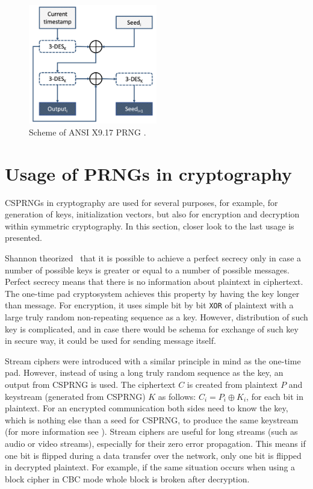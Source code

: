 \documentclass[
    digital,    %
    oneside,    %
    color,
    11pt,
    nocover,
    notable,
    nolof,
    nolot,
    final
]{fithesis3}
\renewcommand\_{\textunderscore\allowbreak}
\begin{document}
\begin{figure}[h]
	\centering
	\includegraphics[width=0.5\textwidth]{./images/pictures/x9-17-prng.png}
	\caption{Scheme of ANSI X9.17 PRNG \cite{ansi1985american,kelsey1998cryptanalytic}.}
	\label{fig:x9-17}
\end{figure}

\section{Usage of PRNGs in cryptography}

CSPRNGs in cryptography are used for several purposes, for example, for generation of keys, initialization vectors, but also for encryption and decryption within symmetric cryptography. In this section, closer look to the last usage is presented.

Shannon theorized~\cite{perfect-secrecy} that it is possible to achieve a perfect secrecy only in case a number of possible keys is greater or equal to a number of possible messages. Perfect secrecy means that there is no information about plaintext in ciphertext. The one-time pad cryptosystem achieves this property by having the key longer than message. For encryption, it uses simple bit by bit \texttt{XOR} of plaintext with a large truly random non-repeating sequence as a key. However, distribution of such key is complicated, and in case there would be schema for exchange of such key in secure way, it could be used for sending message itself. \cite{schneier1996applied}

Stream ciphers were introduced with a similar principle in mind as the one-time pad. However, instead of using a long truly random sequence as the key, an output from CSPRNG is used. The ciphertext $C$ is created from plaintext $P$ and keystream (generated from CSPRNG) $K$ as follows: $C_{i} = P_{i} \oplus K_{i}$, for each bit in plaintext. For an encrypted communication both sides need to know the key, which is nothing else than a seed for CSPRNG, to produce the same keystream (for more information see \cite{schneier1996applied}). Stream ciphers are useful for long streams (such as audio or video streams), especially for their zero error propagation. This means if one bit is flipped during a data transfer over the network, only one bit is flipped in decrypted plaintext. For example, if the same situation occurs when using a block cipher in CBC mode whole block is broken after decryption.
\end{document}
